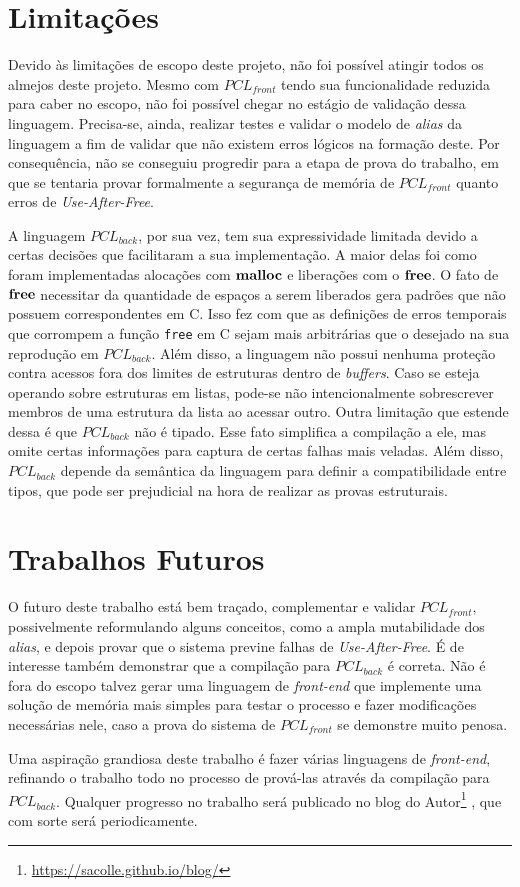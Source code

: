 \section{Limitações}

Devido às limitações de escopo deste projeto, não foi possível atingir todos os almejos deste projeto. Mesmo com $PCL_{front}$ tendo sua funcionalidade reduzida para caber no escopo, não foi possível chegar no estágio de validação dessa linguagem. Precisa-se, ainda, realizar testes e validar o modelo de \emph{alias} da linguagem a fim de validar que não existem erros lógicos na formação deste. Por consequência, não se conseguiu progredir para a etapa de prova do trabalho, em que se tentaria provar formalmente a segurança de memória de $PCL_{front}$ quanto erros de \emph{Use-After-Free}.

A linguagem $PCL_{back}$, por sua vez, tem sua expressividade limitada devido a certas decisões que facilitaram a sua implementação. A maior delas foi como foram implementadas alocações com $\mathbf{malloc}$ e liberações com o $\mathbf{free}$. O fato de $\mathbf{free}$ necessitar da quantidade de espaços a serem liberados gera padrões que não possuem correspondentes em C. Isso fez com que as definições de erros temporais que corrompem a função \lstinline[language=C]|free| em C sejam mais arbitrárias que o desejado na sua reprodução em $PCL_{back}$. Além disso, a linguagem não possui nenhuma proteção contra acessos fora dos limites de estruturas dentro de \emph{buffers}. Caso se esteja operando sobre estruturas em listas, pode-se não intencionalmente sobrescrever membros de uma estrutura da lista ao acessar outro. Outra limitação que estende dessa é que $PCL_{back}$ não é tipado. Esse fato simplifica a compilação a ele, mas omite certas informações para captura de certas falhas mais veladas. Além disso, $PCL_{back}$ depende da semântica da linguagem para definir a compatibilidade entre tipos, que pode ser prejudicial na hora de realizar as provas estruturais.

\section{Trabalhos Futuros}

O futuro deste trabalho está bem traçado, complementar e validar $PCL_{front}$, possivelmente reformulando alguns conceitos, como a ampla mutabilidade dos \emph{alias}, e depois provar que o sistema previne falhas de \emph{Use-After-Free}. É de interesse também demonstrar que a compilação para $PCL_{back}$ é correta. Não é fora do escopo talvez gerar uma linguagem de \emph{front-end} que implemente uma solução de memória mais simples para testar o processo e fazer modificações necessárias nele, caso a prova do sistema de $PCL_{front}$ se demonstre muito penosa.

Uma aspiração grandiosa deste trabalho é fazer várias linguagens de \emph{front-end}, refinando o trabalho todo no processo de prová-las através da compilação para $PCL_{back}$. Qualquer progresso no trabalho será publicado no blog do Autor\footnote{\url{https://sacolle.github.io/blog/}} , que com sorte será periodicamente. 
